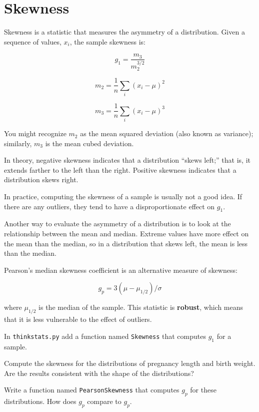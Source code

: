 \documentclass[10pt]{book}
\begin{document}
\section{Skewness}

Skewness is a statistic that measures the asymmetry of a
distribution.  Given a sequence of values, $x_i$, the sample skewness
is:

\[ g_1 = \frac{m_3}{m_2^{3/2}}\]

\[ m_2 = \frac{1}{n} \sum_i (x_i - \mu)^2 \]

\[ m_3 = \frac{1}{n} \sum_i (x_i - \mu)^3 \]

You might recognize $m_2$ as the mean squared deviation (also known as
variance); similarly, $m_3$ is the mean cubed deviation.

In theory, negative skewness indicates that a distribution 
``skews left;'' that is, it extends
farther to the left than the right.  Positive skewness indicates
that a distribution skews right.

In practice, computing the skewness of a sample is usually not
a good idea.  If there are any outliers, they tend to
have a disproportionate effect on $g_1$.

Another way to evaluate the asymmetry of a distribution is to look
at the relationship between the mean and median.
Extreme values have more effect on the mean than the median, so
in a distribution that skews left, the mean is less than the median.

Pearson's median skewness coefficient is an alternative measure
of skewness:

\[ g_p = 3 (\mu - \mu_{1/2}) / \sigma \]

where $\mu_{1/2}$ is the median of the sample.  This statistic is {\bf
  robust}, which means that it is less vulnerable to the effect of
outliers.

\begin{ex}

In {\tt thinkstats.py} add a function named {\tt Skewness} that computes
$g_1$ for a sample.

Compute the skewness for the distributions of pregnancy length and
birth weight.  Are the results consistent with the shape of the
distributions?

Write a function named {\tt PearsonSkewness} that computes $g_p$
for these distributions.  How does $g_p$ compare to $g_p$.

\end{ex}
\end{document}
